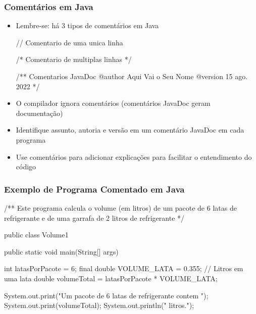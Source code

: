 \documentclass[xcolor={dvipsnames,table},aspectratio=169]{beamer}
\begin{document}
\begin{frame}[fragile]\frametitle{Comentários em Java}
\begin{itemize}
	\item Lembre-se: há 3 tipos de comentários em Java
{\scriptsize
\begin{javacode}
// Comentario de uma unica linha

/*
   Comentario de multiplas linhas
*/

/**
   Comentarios JavaDoc
   @author Aqui Vai o Seu Nome
   @version 15 ago. 2022
*/
\end{javacode}
}
	\item O compilador ignora comentários (comentários JavaDoc geram documentação)
	\item Identifique assunto, autoria e versão em um comentário JavaDoc em cada programa
	\item Use comentários para adicionar explicações para facilitar o entendimento do código
\end{itemize}
\end{frame}

\begin{frame}[fragile]\frametitle{Exemplo de Programa Comentado em Java}
{\footnotesize
\begin{javacode}
/**
   Este programa calcula o volume (em litros) de um pacote de
   6 latas de refrigerante e de uma garrafa de 2 litros de refrigerante
*/

public class Volume1 {
  public static void main(String[] args) {
    int latasPorPacote = 6;
    final double VOLUME_LATA = 0.355; // Litros em uma lata
    double volumeTotal = latasPorPacote * VOLUME_LATA;

    System.out.print("Um pacote de 6 latas de refrigerante contem ");
    System.out.print(volumeTotal);
    System.out.println(" litros.");
  }
}
\end{javacode}
}
\end{frame}
\end{document}
